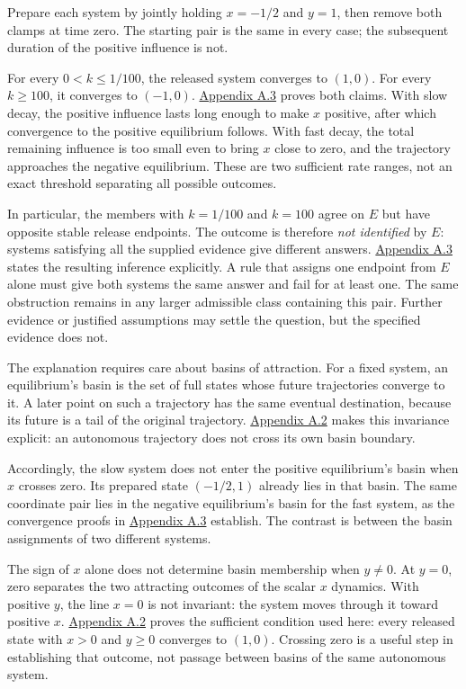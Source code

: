 Prepare each system by jointly holding \(x=-1/2\) and \(y=1\), then remove both clamps at time zero. The starting pair is the same in every case; the subsequent duration of the positive influence is not.

For every \(0<k\leq1/100\), the released system converges to \((1,0)\). For every \(k\geq100\), it converges to \((-1,0)\). \hyperref[app:a.3]{Appendix A.3} proves both claims. With slow decay, the positive influence lasts long enough to make \(x\) positive, after which convergence to the positive equilibrium follows. With fast decay, the total remaining influence is too small even to bring \(x\) close to zero, and the trajectory approaches the negative equilibrium. These are two sufficient rate ranges, not an exact threshold separating all possible outcomes.

In particular, the members with \(k=1/100\) and \(k=100\) agree on \(E\) but have opposite stable release endpoints. The outcome is therefore \emph{not identified} by \(E\): systems satisfying all the supplied evidence give different answers. \hyperref[app:a.3]{Appendix A.3} states the resulting inference explicitly. A rule that assigns one endpoint from \(E\) alone must give both systems the same answer and fail for at least one. The same obstruction remains in any larger admissible class containing this pair. Further evidence or justified assumptions may settle the question, but the specified evidence does not.

The explanation requires care about basins of attraction. For a fixed system, an equilibrium’s basin is the set of full states whose future trajectories converge to it. A later point on such a trajectory has the same eventual destination, because its future is a tail of the original trajectory. \hyperref[app:a.2]{Appendix A.2} makes this invariance explicit: an autonomous trajectory does not cross its own basin boundary.

Accordingly, the slow system does not enter the positive equilibrium’s basin when \(x\) crosses zero. Its prepared state \((-1/2,1)\) already lies in that basin. The same coordinate pair lies in the negative equilibrium’s basin for the fast system, as the convergence proofs in \hyperref[app:a.3]{Appendix A.3} establish. The contrast is between the basin assignments of two different systems.

The sign of \(x\) alone does not determine basin membership when \(y\neq0\). At \(y=0\), zero separates the two attracting outcomes of the scalar \(x\) dynamics. With positive \(y\), the line \(x=0\) is not invariant: the system moves through it toward positive \(x\). \hyperref[app:a.2]{Appendix A.2} proves the sufficient condition used here: every released state with \(x>0\) and \(y\geq0\) converges to \((1,0)\). Crossing zero is a useful step in establishing that outcome, not passage between basins of the same autonomous system.

